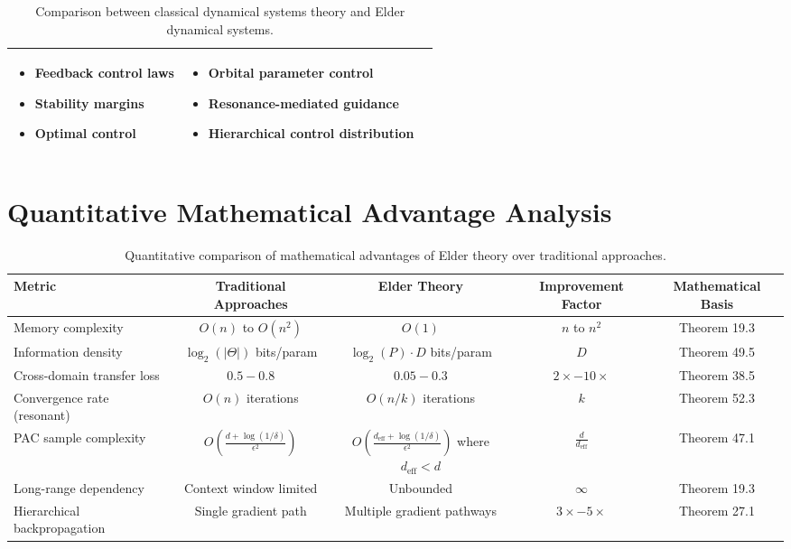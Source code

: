 \begin{table}[h]
\begin{tabular}{|p{3cm}|p{5cm}|p{5cm}|}
\begin{itemize}
    \item Feedback control laws
    \item Stability margins
    \item Optimal control
\end{itemize} &
\begin{itemize}
    \item Orbital parameter control
    \item Resonance-mediated guidance
    \item Hierarchical control distribution
\end{itemize} \\
\hline
\end{tabular}
\caption{Comparison between classical dynamical systems theory and Elder dynamical systems.}
\label{tab:dynamical_comparison}
\end{table}

\section{Quantitative Mathematical Advantage Analysis}

\begin{table}[h]
\centering
\begin{tabular}{|p{3.5cm}|c|c|c|c|}
\hline
\textbf{Metric} & \textbf{Traditional Approaches} & \textbf{Elder Theory} & \textbf{Improvement Factor} & \textbf{Mathematical Basis} \\
\hline
Memory complexity & $O(n)$ to $O(n^2)$ & $O(1)$ & $n$ to $n^2$ & Theorem 19.3 \\
\hline
Information density & $\log_2(|\Theta|)$ bits/param & $\log_2(P) \cdot D$ bits/param & $D$ & Theorem 49.5 \\
\hline
Cross-domain transfer loss & $0.5 - 0.8$ & $0.05 - 0.3$ & $2\times - 10\times$ & Theorem 38.5 \\
\hline
Convergence rate (resonant) & $O(n)$ iterations & $O(n/k)$ iterations & $k$ & Theorem 52.3 \\
\hline
PAC sample complexity & $O\left(\frac{d + \log(1/\delta)}{\epsilon^2}\right)$ & $O\left(\frac{d_{\text{eff}} + \log(1/\delta)}{\epsilon^2}\right)$ where $d_{\text{eff}} < d$ & $\frac{d}{d_{\text{eff}}}$ & Theorem 47.1 \\
\hline
Long-range dependency & Context window limited & Unbounded & $\infty$ & Theorem 19.3 \\
\hline
Hierarchical backpropagation & Single gradient path & Multiple gradient pathways & $3\times - 5\times$ & Theorem 27.1 \\
\hline
\end{tabular}
\caption{Quantitative comparison of mathematical advantages of Elder theory over traditional approaches.}
\label{tab:quantitative_comparison}
\end{table}

